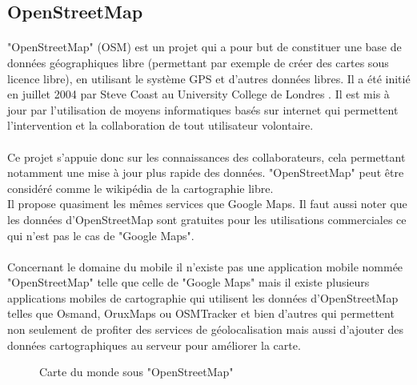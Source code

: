 \subsection{OpenStreetMap}
      \paragraph{}
	"OpenStreetMap" (OSM) est un projet qui a pour but de constituer une base de données géographiques libre  (permettant par exemple de créer des cartes sous licence libre), en utilisant le système GPS et d'autres 
	données libres. Il a été initié en juillet 2004 par Steve Coast au University College de Londres \cite{U}. Il est mis à jour par l'utilisation de 
	moyens informatiques basés sur internet qui permettent l'intervention et la collaboration de tout utilisateur 
	volontaire.\\
	
      \paragraph{}
	Ce projet s'appuie donc sur les connaissances des collaborateurs, cela permettant notamment une mise à jour plus rapide 
	des données. "OpenStreetMap" peut être considéré comme le wikipédia de la cartographie libre.\\
	Il propose quasiment les mêmes services que Google Maps. Il faut aussi noter que les données d'OpenStreetMap
	sont gratuites pour les utilisations commerciales ce qui n'est pas le cas de "Google Maps".
	
      \paragraph{}
	Concernant le domaine du mobile il n'existe pas une application mobile nommée "OpenStreetMap" telle que celle de "Google Maps" mais
	 il existe plusieurs applications mobiles de cartographie qui utilisent les données d'OpenStreetMap telles que Osmand, OruxMaps
	 ou OSMTracker et bien d'autres \cite{V} qui permettent non seulement de profiter des services de géolocalisation mais aussi
	 d'ajouter des données cartographiques au serveur pour améliorer la carte.

      	  \begin{figure}[H]
	   \begin{center}
	    \caption[Carte du monde sous "OpenStreetMap"]{Carte du monde sous "OpenStreetMap" \protect \footnotemark}
	    \label{Carte du monde sous OpenStreetMap}
	   \end{center}
	  \end{figure}
	  
